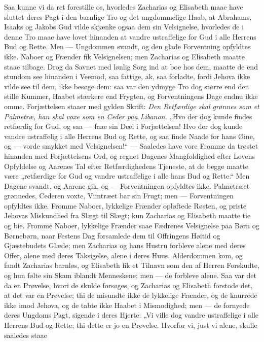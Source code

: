 \documentclass[12pt,a4paper]{book}
\begin{document}
Saa kunne vi da ret forestille os, hvorledes Zacharias og
Elisabeth maae have sluttet deres Pagt i den barnlige Tro og det
ungdommelige Haab, at Abrahams, Isaaks og Jakobs Gud vilde
skjænke ogsaa dem sin Velsignelse, hvorledes de i denne Tro maae
have lovet hinanden at vandre ustraffelige for Gud i alle Herrens
Bud og Rette. Men --- Ungdommen svandt, og den glade Forventning
opfyldtes ikke. Naboer og Frænder fik Velsignelsen; men Zacharias
og Elisabeth maatte staae tilbage. Drog da Savnet med lønlig Sorg
ind at boe hos dem, maatte de end stundom see hinanden i Veemod,
saa fattige, ak, saa forladte, fordi Jehova ikke vilde see til
dem, ikke besøge dem: saa var den ydmyge Tro dog større end den
stille Kummer, Haabet stærkere end Frygten, og Forventningens Dage
endnu ikke omme. Forjættelsen staaer med gylden Skrift:
\emph{Den Retfærdige skal grønnes som et Palmetræ, han skal voxe
som en Ceder paa Libanon.} „Hvo der dog kunde findes retfærdig
for Gud, og saa --- faae sin Deel i Forjættelsen! Hvo der dog
kunde vandre ustraffelig i alle Herrens Bud og Rette, og saa finde
Naade for hans Øine, og --- vorde smykket med Velsignelsen!“ ---
Saaledes have vore Fromme da trøstet hinanden med Forjættelsens
Ord, og regnet Dagenes Mangfoldighed efter Lovens Opfyldelse og
Aarenes Tal efter Retfærdighedens Tjeneste, at de begge maatte
være „retfærdige for Gud og vandre ustraffelige i alle hans Bud og
Rette.“ Men Dagene svandt, og Aarene gik, og --- Forventningen
opfyldtes ikke. Palmetræet grønnedes, Cederen voxte, Viintræet
bar sin Frugt; men --- Forventningen opfyldtes ikke. Fromme
Naboer, lykkelige Frænder opløftede Røsten, og priste Jehovas
Miskundhed fra
Slægt til Slægt; kun Zacharias og Elisabeth maatte tie og bie.
Fromme Naboer, lykkelige Frænder saae Fædrenes Velsignelse paa
Børn og Børnebørn, naar Festens Dag forsamlede dem til Offringens
Høitid og Gjæstebudets Glæde; men Zacharias og hans Hustru
forbleve alene med deres Offer, alene med deres Taksigelse, alene
i deres Huus. Alderdommen kom, og fandt Zacharias barnløs, og
Elisabeth fik et Tilnavn som den af Herren Forskudte, og hun følte
sin Skam iblandt Menneskene; men --- de forbleve alene. Saa var
det da en Prøvelse, hvori de skulde forsøges, og Zacharias og
Elisabeth forstode det, at det var en Prøvelse; thi de misundte
ikke de lykkelige Frænder, og de knurrede ikke imod Jehova, og de
tabte ikke Haabet i Mismodighed; men --- de fornyede deres
Ungdoms Pagt, sigende i deres Hjerte: „Vi ville dog vandre
ustraffelige i alle Herrens Bud og Rette; thi dette er jo en
Prøvelse. Hvorfor vi, just vi alene, skulle saaledes staae
\end{document}
